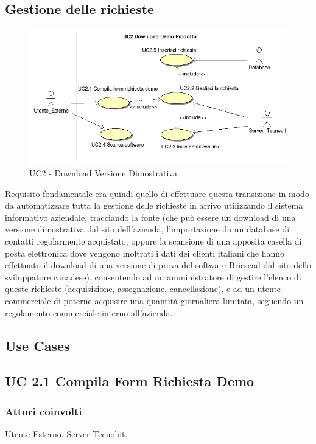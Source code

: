 \subsection{Gestione delle richieste}
\begin{figure}[!ht]
\centering
 \includegraphics[scale=0.7]{./images/UC2_download.png}
\caption{UC2 - Download Versione Dimostrativa}
\end{figure}

\noindent
Requisito fondamentale era quindi quello di effettuare questa transizione in modo da automatizzare tutta la gestione delle richieste in arrivo utilizzando il sistema informativo aziendale, tracciando la fonte (che pu\`o essere un download di una versione dimostrativa dal sito dell'azienda, l'importazione da un database di contatti regolarmente acquistato, oppure la scansione di una apposita casella di posta elettronica dove vengono inoltrati i dati dei clienti italiani che hanno effettuato il download di una versione di prova del software Bricscad dal sito dello sviluppatore canadese), consentendo ad un amministratore di gestire l'elenco di queste richieste (acquisizione, assegnazione, cancellazione), e ad un utente commerciale di poterne acquisire una quantit\`a giornaliera limitata, seguendo un regolamento commerciale interno all'azienda.
\subsection{Use Cases}

\subsection*{UC 2.1 Compila Form Richiesta Demo}
\subsubsection*{Attori coinvolti} Utente Esterno, Server Tecnobit.

